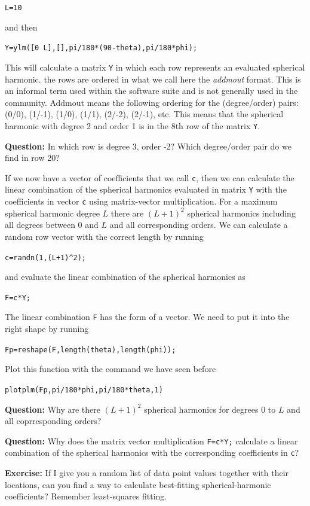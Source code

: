 \documentclass[11pt]{article}
\begin{document}
  \quad \verb+L=10+
  
  and then
  
   \quad \verb+Y=ylm([0 L],[],pi/180*(90-theta),pi/180*phi);+
   
   This will calculate a matrix \verb+Y+ in which each row represents an evaluated spherical harmonic. the rows are ordered in what we call here the \emph{addmout} format. This is an informal term used within the software suite and is not generally used in the community. Addmout means the following ordering for the (degree/order) pairs: (0/0), (1/-1), (1/0), (1/1), (2/-2), (2/-1), etc. This means that the spherical harmonic with degree 2 and order 1 is in the 8th row of the matrix \verb+Y+. 
   
   \textbf{Question:} In which row is degree 3, order -2? Which degree/order pair do we find in row 20?
   
   If we now have a vector of coefficients that we call \verb+c+, then we can calculate the linear combination of the spherical harmonics evaluated in matrix \verb+Y+ with the coefficients in vector \verb+c+ using matrix-vector multiplication. For a maximum spherical harmonic degree $L$ there are $(L+1)^2$ spherical harmonics including all degrees between 0 and $L$ and all corresponding orders. 
   We can calculate a random row vector with the correct length by running
   
   \quad \verb!c=randn(1,(L+1)^2);!
   
   and evaluate the linear combination of the spherical harmonics as
   
    \quad \verb!F=c*Y;!
   
   The linear combination \verb!F! has the form of a vector. We need to put it into the right shape by running 
   
   \quad \verb!Fp=reshape(F,length(theta),length(phi));!
   
   Plot this function with the command we have seen before
   
    \qquad \verb+plotplm(Fp,pi/180*phi,pi/180*theta,1)+
   
   \textbf{Question:} Why are there $(L+1)^2$ spherical harmonics for degrees 0 to $L$ and all coprresponding orders?
   
   \textbf{Question:} Why does the matrix vector multiplication \verb!F=c*Y;! calculate a linear combination of the spherical harmonics with the corresponding coefficients in \verb+c+?
   
   
   \textbf{Exercise:} If I give you a random list of data point values together with their locations, can you find a way to calculate best-fitting spherical-harmonic coefficients? Remember least-squares fitting. 
   
   
   
   
    
   
 
   
  
\end{document}
